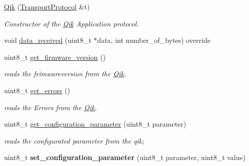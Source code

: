 \begin{DoxyCompactItemize}
\item 
\hyperlink{class_qik_a40dc67c7d28bb8e5148fa459795482b3}{Qik} (\hyperlink{class_transport_protocol}{Transport\+Protocol} \&t)
\begin{DoxyCompactList}\small\item\em Constructor of the \hyperlink{class_qik}{Qik} Application protocol. \end{DoxyCompactList}\item 
void \hyperlink{class_qik_a0104c2a0c22fbbf83de456cc7cb9840d}{data\+\_\+received} (uint8\+\_\+t $\ast$data, int number\+\_\+of\+\_\+bytes) override
\item 
uint8\+\_\+t \hyperlink{class_qik_adb551278953edfda128886a9df14e986}{get\+\_\+firmware\+\_\+version} ()
\begin{DoxyCompactList}\small\item\em reads the frimwareversion from the \hyperlink{class_qik}{Qik}. \end{DoxyCompactList}\item 
uint8\+\_\+t \hyperlink{class_qik_ad65a5d6fbdfde7998b4ef537ad07b843}{get\+\_\+errors} ()
\begin{DoxyCompactList}\small\item\em reads the Errors from the \hyperlink{class_qik}{Qik}. \end{DoxyCompactList}\item 
uint8\+\_\+t \hyperlink{class_qik_a8b4e0f9f0c42cc812f9ead37a766e5ff}{get\+\_\+configuration\+\_\+parameter} (uint8\+\_\+t parameter)
\begin{DoxyCompactList}\small\item\em reads the configurated parameter from the qik; \end{DoxyCompactList}\item 
\hypertarget{class_qik_a6201e2e6a24997827aefd2eac20524f6}{}uint8\+\_\+t {\bfseries set\+\_\+configuration\+\_\+parameter} (uint8\+\_\+t parameter, uint8\+\_\+t value)\label{class_qik_a6201e2e6a24997827aefd2eac20524f6}


\end{DoxyCompactItemize}
